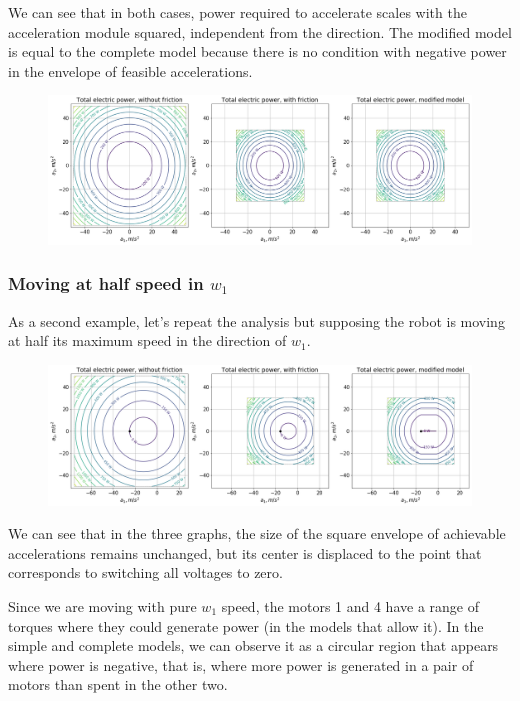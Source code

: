 \documentclass[12pt]{article}
\begin{document}
We can see that in both cases, power required to accelerate scales with the acceleration module squared, independent from the direction. The modified model is equal to the complete model because there is no condition with negative power in the envelope of feasible accelerations.
\begin{figure}[h]
	\centering
	\includegraphics[width=1\linewidth]{power_from_static}
	\label{fig:power_from_static}
\end{figure}

\subsubsection*{Moving at half speed in $w_1$}
As a second example, let's repeat the analysis but supposing the robot is moving at half its maximum speed in the direction of $w_1$.
\begin{figure}[h]
	\centering
	\includegraphics[width=1\linewidth]{power_from_w1}
	\label{fig:power_from_w1}
\end{figure}
We can see that in the three graphs, the size of the square envelope of achievable accelerations remains unchanged, but its center is displaced to the point that corresponds to switching all voltages to zero.

Since we are moving with pure $w_1$ speed, the motors 1 and 4 have a range of torques where they could generate power (in the models that allow it). In the simple and complete models, we can observe it as a circular region that appears where power is negative, that is, where more power is generated in a pair of motors than spent in the other two.
\end{document}

